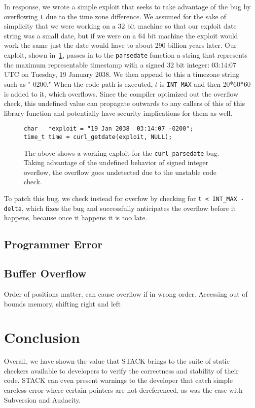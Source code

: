 \documentclass[9pt,twocolumn]{article}
\begin{document}
In response, we wrote a simple exploit that seeks to take advantage of the bug by overflowing \texttt{t} due to the time zone difference. We assumed for the sake of simplicity that we were working on a 32 bit machine so that our exploit date string was a small date, but if we were on a 64 bit machine the exploit would work the same just the date would have to about 290 billion years later. Our exploit, shown in~\ref{fig:curl-xploit}, passes in to the \texttt{parsedate} function a string that represents the maximum representable timestamp with a signed 32 bit integer: 03:14:07 UTC on Tuesday, 19 January 2038. We then append to this a timezone string such as "-0200." When the code path is executed, $t$ is \texttt{INT\_MAX} and then 20*60*60 is added to it, which overflows. Since the compiler optimized out the overflow check, this undefined value can propagate outwards to any callers of this of this library function and potentially have security implications for them as well.

\begin{figure}[h]
\begin{lstlisting}
char   *exploit = "19 Jan 2038  03:14:07 -0200";
time_t time = curl_getdate(exploit, NULL);
\end{lstlisting}
\label{fig:curl-xploit}
\caption{The above shows a working exploit for the \texttt{curl\_parsedate} bug. Taking advantage of the undefined behavior of signed integer overflow, the overflow goes undetected due to the unstable code check. }
\end{figure}

To patch this bug, we check instead for overfow by checking for \texttt{t < INT\_MAX - delta}, which fixes the bug and successfully anticipates the overflow before it happens, because once it happens it is too late.



\subsection{Programmer Error}

\subsection{Buffer Overflow}

Order of positions matter, can cause overflow if in wrong order. Accessing out of bounds memory, shifting right and left



\section{Conclusion}
\label{sec:conclusion}
Overall, we have shown the value that STACK brings to the suite of static
checkers available to developers to verify the correctness and stability of
their code. STACK can even present warnings to the developer that catch simple
careless error where certain pointers are not dereferenced, as was the case
with Subversion and Audacity.
\end{document}
